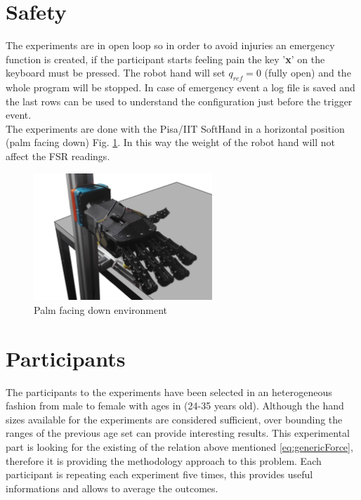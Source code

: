 \section{Safety}\label{sec:safety}
The experiments are in open loop so in order to avoid injuries an emergency function is created, if the participant starts feeling pain the key '\textbf{x}' on the keyboard must be pressed. The robot hand will set $q_{ref}=0$ (fully open) and the whole program will be stopped.
In case of emergency event a log file is saved and the last rows can be used to understand the configuration just before the trigger event.\\
The experiments are done with the Pisa/IIT SoftHand in a horizontal position (palm facing down) Fig. \ref{Fig:palmdown}. In this way the weight of the robot hand will not affect the FSR readings. 

\begin{figure}[ht]
\centering
\includegraphics[width=0.6\textwidth]{Figure/stand.png}
\caption{Palm facing down environment}
\label{Fig:palmdown}
\end{figure}

\section*{Participants}\label{sec:participants}
The participants to the experiments have been selected in an heterogeneous fashion from male to female with ages in (24-35 years old). Although the hand sizes available for the experiments are considered sufficient, over bounding the ranges of the previous age set can provide interesting results.
This experimental part is looking for the existing of the relation above mentioned \eqref{eq:genericForce}, therefore it is providing the methodology approach to this problem.
Each participant is repeating each experiment five times, this provides useful informations and allows to average the outcomes.

